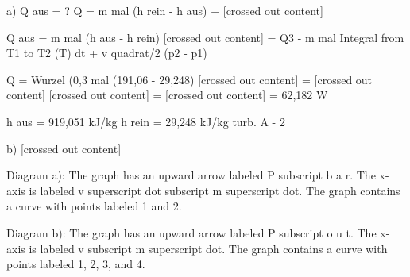 a) Q aus = ?
Q = m mal (h rein - h aus) + [crossed out content] 

Q aus = m mal (h aus - h rein) [crossed out content] = Q3 - m mal Integral from T1 to T2 (T) dt + v quadrat/2 (p2 - p1)

Q = Wurzel (0,3 mal (191,06 - 29,248) [crossed out content] = [crossed out content] [crossed out content] = [crossed out content] = 62,182 W

h aus = 919,051 kJ/kg
h rein = 29,248 kJ/kg
turb. A - 2

b) [crossed out content]

Diagram a): 
The graph has an upward arrow labeled P subscript b a r. The x-axis is labeled v superscript dot subscript m superscript dot. The graph contains a curve with points labeled 1 and 2.

Diagram b): 
The graph has an upward arrow labeled P subscript o u t. The x-axis is labeled v subscript m superscript dot. The graph contains a curve with points labeled 1, 2, 3, and 4.